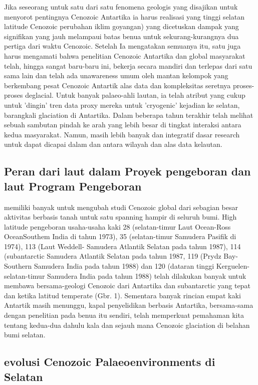 		Jika seseorang untuk satu dari satu fenomena geologis yang disajikan untuk menyorot pentingnya Cenozoic Antartika ia harus realisasi yang tinggi 
	selatan latitude Cenozoic perubahan iklim goyangan) yang dicetuskan dampak yang signifikan yang jauh melampaui batas benua untuk sekurang-kurangnya 
	dua pertiga dari waktu Cenozoic. Setelah Ia mengatakan semuanya itu, satu juga harus mengamati bahwa penelitian Cenozoic Antartika dan global 
	masyarakat telah, hingga sangat baru-baru ini, bekerja secara mandiri dan terlepas dari satu sama lain dan telah ada unawareness umum oleh mantan 
	kelompok yang berkembang pesat Cenozoic Antartik alas data dan kompleksitas seretnya proses-proses deglacial. Untuk banyak palaeo-ahli lautan, 
	ia telah atribut yang cukup untuk 'dingin' tren data proxy mereka untuk 'cryogenic' kejadian ke selatan, barangkali glaciation di Antartika. 
	Dalam beberapa tahun terakhir telah melihat sebuah sambutan pindah ke arah yang lebih besar di tingkat interaksi antara kedua masyarakat. 
	Namun, masih lebih banyak dan integratif dasar research untuk dapat dicapai dalam dan antara wilayah dan alas data kelautan.
	
	
\subsection{Peran dari laut dalam Proyek pengeboran dan laut Program Pengeboran}
		
		memiliki banyak untuk mengubah studi Cenozoic global dari sebagian besar aktivitas berbasis tanah untuk satu spanning hampir di seluruh bumi. 
	High latitude pengeboran usaha-usaha kaki 28 (selatan-timur Laut Ocean-Ross OceanSouthem India di tahun 1973), 35 (selatan-timur Samudera Pasifik di 1974), 
	113 (Laut Weddell- Samudera Atlantik Selatan pada tahun 1987), 114 (subantarctic Samudera Atlantik Selatan pada tahun 1987, 
	119 (Prydz Bay-Southern Samudera India pada tahun 1988) dan 120 (dataran tinggi Kerguelen-selatan-timur Samudera India pada tahun 1988) telah dilakukan 
	banyak untuk membawa bersama-geologi Cenozoic dari Antartika dan subantarctic yang tepat dan ketika latitud temperate (Gbr. 1). 
	Sementara banyak rincian empat kaki Antartik masih menunggu, kapal penyelidikan berbasis Antartika, bersama-sama dengan penelitian pada benua itu 
	sendiri, telah memperkuat pemahaman kita tentang kedua-dua dahulu kala dan sejauh mana Cenozoic glaciation di belahan bumi selatan.
	

\subsection{evolusi Cenozoic Palaeoenvironments di Selatan}

